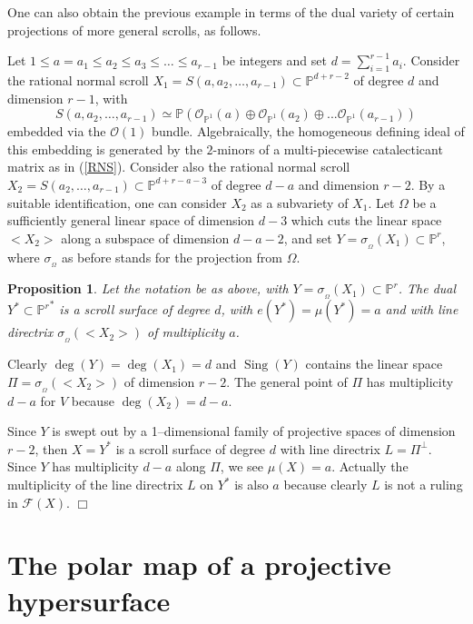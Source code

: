 \documentclass[11pt]{article}   %
\newtheorem{Proposition}[Theorem]{Proposition}
\theoremstyle{definition}
\numberwithin{Theorem}{section} \numberwithin{equation}{section}
\def\demo{\noindent{\it Proof. }}
\def\QED{\hfill$\Box$}
\def\qed{\QED}
\newcommand{\Sing}{\operatorname{Sing}}
\renewcommand{\O}{{\mathcal O}}
\newcommand{\F}{{\mathcal F}}
\newcommand{\Proj}{{\mathbb P}}
\newcommand{\p}{{\mathbb P}}
\begin{document}
{One can also obtain the previous example in terms of the dual
variety of certain projections of more general
 scrolls, {as follows.}


Let $1\leq a=a_1\leq a_2\leq a_3\leq\ldots\leq a_{r-1}$ be integers
and set $d=\sum_{i=1}^{r-1}a_i$. Consider the rational normal scroll
$X_1=S(a,a_2,\ldots,a_{r-1})\subset\p^{d+r-2}$ of degree $d$ and
dimension $r-1$, with
$$S(a,a_2,\ldots,a_{r-1})\simeq \Proj(\O_{\Proj^ 1}(a)\oplus\O_{\Proj^
1}(a_2)\oplus... \O_{\Proj^ 1}(a_{r-1}))$$ embedded via the $\O(1)$
bundle. Algebraically, the homogeneous defining ideal of this
embedding is generated by the $2$-minors of a multi-piecewise
catalecticant matrix as in (\ref{RNS}). Consider also the rational
normal scroll $X_2=S(a_2,\ldots,a_{r-1})\subset\p^{d+r-a-3}$ of
degree $d-a$ and dimension $r-2$. By a suitable identification, one
can consider $X_2$ as a subvariety of $X_1$. Let $\Omega$ be a
sufficiently general linear space of dimension $d-3$ which cuts the
linear space $<X_2>$ along a subspace of dimension $d-a-2$, and set
$Y=\sigma_{_{\Omega}}(X_1)\subset\p^r$, where $\sigma_{_{\Omega}}$
as before stands for the projection from $\Omega$.



\begin{Proposition}\label{multi_scrolls} Let the notation be as above,
with $Y=\sigma_{_{\Omega}}(X_1)\subset\p^r$. The dual $Y^*\subset
{\p^r}^*$ is a scroll surface of degree $d$, with $e(Y^
*)=\mu(Y^*)=a$ and with  line directrix $\sigma_{_{\Omega}}(<X_2>)$ of
multiplicity $a$.
\end{Proposition}
\demo Clearly $\deg(Y)=\deg(X_1)=d$ and $\Sing(Y)$ contains the
linear space $\Pi=\sigma_{_{\Omega}}(<X_2>)$ of dimension $r-2$. The
general point of $\Pi$ has multiplicity $d-a$ for $V$ because
$\deg(X_2)=d-a$.

Since $Y$ is swept out by a 1--dimensional family of projective
spaces of dimension $r-2$, then $X=Y^ *$ is a scroll surface of
degree $d$ with line directrix $L=\Pi^ \perp$.  Since $Y$  has
multiplicity $d-a$ along $\Pi$, we see $\mu(X)=a$. Actually the
multiplicity of the line directrix $L$ on $Y^*$ is also $a$ because
clearly $L$ is not a ruling in $\F(X)$. \qed





\section{The polar map of a projective hypersurface} \label {polarmap}

}
\end{document}
